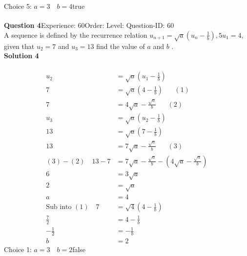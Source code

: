 \documentclass{article}
\begin{document}
Choice 5: \hspace{20pt}$a=3\quad b=4$\hspace{20pt}true\\
\\[4pt]
\noindent\textbf{Question 4}\hspace{20pt}Experience: 60\hspace{20pt}Order: \hspace{20pt}Level: \hspace{20pt}Question-ID: 60\\[2pt]
A sequence is defined by the recurrence relation $u_{n+1}=\sqrt{a}\left(u_n-\displaystyle\frac{1}{b}\right),5 u_1=4$, given that $u_2=7$ and $u_3=13$ find the value of $a$ and $b$ .\\[4pt]
\noindent\textbf{Solution 4}\\[2pt]
\\[-35pt]\begin{align*}
u_2&=\sqrt{a}\left(u_1-\displaystyle\frac{1}{b}\right)\\[2pt]
7&=\sqrt{a}\left(4-\displaystyle\frac{1}{b}\right)\hspace{20pt}(1)\\[2pt]
7&=4\sqrt{a}-\displaystyle\frac{\sqrt{a}}{b}\hspace{20pt}(2)\\[12pt]
u_3&=\sqrt{a}\left(u_2-\displaystyle\frac{1}{b}\right)\\[2pt]
13&=\sqrt{a}\left(7-\displaystyle\frac{1}{b}\right)\\[2pt]
13&=7\sqrt{a}-\displaystyle\frac{\sqrt{a}}{b}\hspace{20pt}(3)\\[12pt]
(3)-(2)\quad13-7&=7\sqrt{a}-\displaystyle\frac{\sqrt{a}}{b}-\left(4\sqrt{a}-\displaystyle\frac{\sqrt{a}}{b}\right)\\[2pt]
6&=3\sqrt{a}\\[2pt]
2&=\sqrt{a}\\[2pt]
a&=4\\[12pt]
\text{Sub into} \,\,(1)\quad 7&=\sqrt{4}\left(4-\displaystyle\frac{1}{b}\right)\\[2pt]
\displaystyle\frac{7}{2}&=4-\displaystyle\frac{1}{b}\\[2pt]
-\displaystyle\frac{1}{2}&=-\displaystyle\frac{1}{b}\\[2pt]
b&=2
\end{align*}
Choice 1: \hspace{20pt}$a=3\quad b=2$\hspace{20pt}false\\
\end{document}
